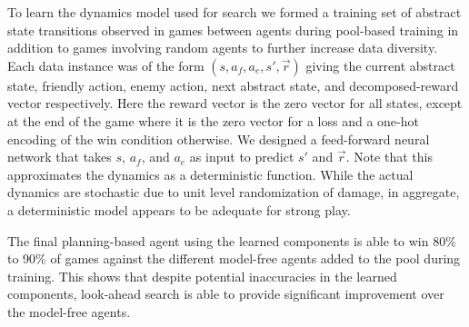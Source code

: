 \documentclass[letterpaper]{article} %
\begin{document}

To learn the dynamics model used for search we formed a training set of abstract state transitions observed in games between agents during pool-based training in addition to games involving random agents to further increase data diversity. Each data instance was of the form $(s, a_f, a_e, s', \vec{r})$ giving the current abstract state, friendly action, enemy action, next abstract state, and decomposed-reward vector respectively. Here the reward vector is the zero vector for all states, except at the end of the game where it is the zero vector for a loss and a one-hot encoding of the win condition otherwise. We designed a feed-forward neural network that takes $s$, $a_f$, and $a_e$ as input to predict $s'$ and $\vec{r}$. Note that this approximates the dynamics as a deterministic function. While the actual dynamics are stochastic due to unit level randomization of damage, in aggregate, a deterministic model appears to be adequate for strong play. 

The final planning-based agent using the learned components is able to win 80\% to 90\% of games against the different model-free agents added to the pool during training. This shows that despite potential inaccuracies in the learned components, look-ahead search is able to provide significant improvement over the model-free agents. 



\end{document}
